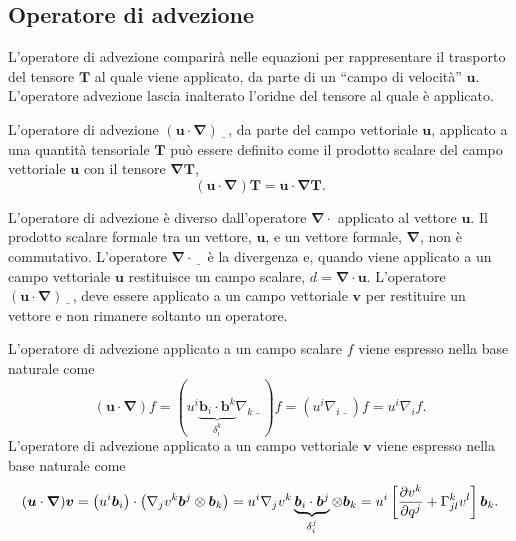 \subsection{Operatore di advezione}
L'operatore di advezione comparirà nelle equazioni per rappresentare il trasporto del tensore $\bm{T}$ al quale viene applicato, da parte di un ``campo di velocità'' $\bm{u}$. L'operatore advezione lascia inalterato l'oridne del tensore al quale è applicato.
\begin{operator} L'operatore di advezione $(\bm{u} \cdot \bm{\nabla})\underline{\hspace{8pt}}$, da parte del campo vettoriale $\bm{u}$, applicato a una quantità tensoriale $\bm{T}$ può essere definito come il prodotto scalare del campo vettoriale $\bm{u}$ con il tensore $\bm{\nabla} \bm{T}$,
 \begin{equation}
  (\bm{u} \cdot \bm{\nabla}) \bm{T} = \bm{u} \cdot \bm{\nabla}\bm{T} .
 \end{equation}
 \end{operator}
 \begin{remark}
  L'operatore di advezione è diverso dall'operatore $\bm{\nabla} \cdot$ applicato al vettore $\bm{u}$. Il prodotto scalare formale tra un vettore, $\bm{u}$, e un vettore formale, $\bm{\nabla}$, non è commutativo. L'operatore $\bm{\nabla} \cdot \underline{\hspace{8pt}}$ è la divergenza e, quando viene applicato a un campo vettoriale $\bm{u}$ restituisce un campo scalare, $d = \bm{\nabla} \cdot \bm{u}$. L'operatore $(\bm{u} \cdot \bm{\nabla})\underline{\hspace{8pt}} $, deve essere applicato a un campo vettoriale $\bm{v}$ per restituire un vettore e non rimanere soltanto un operatore. %
 \end{remark}
 L'operatore di advezione applicato a un campo scalare $f$ viene espresso nella base naturale come
 \begin{equation}
  (\bm{u} \cdot \bm{\nabla})f = \left( u^i \underbrace{\bm{b}_i \cdot \bm{b}^k}_{\delta_i^k} \nabla_k{\underline{\hspace{8pt}}} \right) f  = \left( u^i \nabla_i{\underline{\hspace{8pt}}} \right) f = u^i \nabla_i {f} .
 \end{equation}
 L'operatore di advezione applicato a un campo vettoriale $\bm{v}$ viene espresso nella base naturale come
 \begin{equation}
  (\bm{u} \cdot \bm{\nabla}) \bm{v} = \left( u^i \bm{b}_i \right) \cdot \left( \nabla_{j} v^k \bm{b}^j \otimes \bm{b}_k \right) = 
  u^i  \nabla_{j} v^k  \underbrace{\bm{b}_i \cdot \bm{b}^j}_{\delta_i^j} \otimes \bm{b}_k = u^i \left[ \dfrac{\partial v^k}{\partial q^j} + \Gamma^k_{jl} v^l \right] \bm{b}_k .
 \end{equation}
